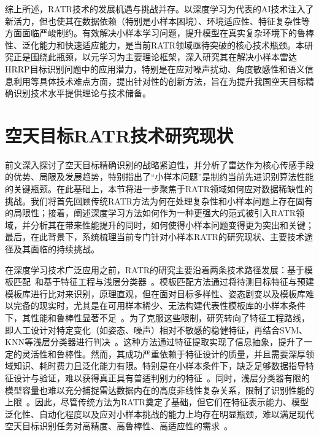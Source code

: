 综上所述，RATR技术的发展机遇与挑战并存。以深度学习为代表的AI技术注入了新活力，但也使其在数据依赖（特别是小样本困境）、环境适应性、特征复杂性等方面面临严峻制约。有效解决小样本学习问题，提升模型在真实复杂环境下的鲁棒性、泛化能力和快速适应能力，是当前RATR领域亟待突破的核心技术瓶颈。本研究正是围绕此瓶颈，以元学习为主要理论框架，深入研究其在解决小样本雷达HRRP目标识别问题中的应用潜力，特别是在应对噪声扰动、角度敏感性和语义信息利用等具体技术难点方面，提出针对性的创新方法，旨在为提升我国空天目标精确识别技术水平提供理论与技术储备。

\section{空天目标RATR技术研究现状}
前文深入探讨了空天目标精确识别的战略紧迫性，并分析了雷达作为核心传感手段的优势、局限及发展趋势，特别指出了“小样本问题”是制约当前先进识别算法性能的关键瓶颈。在此基础上，本节将进一步聚焦于RATR领域如何应对数据稀缺性的挑战。我们将首先回顾传统RATR方法为何在处理复杂性和小样本问题上存在固有的局限性；接着，阐述深度学习方法如何作为一种更强大的范式被引入RATR领域，并分析其在带来性能提升的同时，如何使得小样本问题变得更为突出和关键；最后，在此背景下，系统梳理当前专门针对小样本RATR的研究现状、主要技术途径及其面临的持续挑战。

在深度学习技术广泛应用之前，RATR的研究主要沿着两条技术路径发展：基于模板匹配~\cite{X}和基于特征工程与浅层分类器~\cite{X}。模板匹配方法通过将待测目标特征与预建模板库进行比对来识别，原理直观，但在面对目标多样性、姿态剧变以及模板库难以完备的现实时，尤其是在可用样本稀少、无法构建代表性模板库的小样本条件下，其性能和鲁棒性显著不足~\cite{X}。为了克服这些限制，研究转向了特征工程路线，即人工设计对特定变化（如姿态、噪声）相对不敏感的稳健特征，再结合SVM、KNN等浅层分类器进行判决~\cite{X}。这种方法通过特征提取实现了信息抽象，提升了一定的灵活性和鲁棒性。然而，其成功严重依赖于特征设计的质量，并且需要深厚领域知识、耗时费力且泛化能力有限。特别是在小样本条件下，缺乏足够数据指导特征设计与验证，难以获得真正具有普适判别力的特征~\cite{X}。同时，浅层分类器有限的模型容量也难以充分捕捉雷达数据内在的高度非线性复杂关系，限制了识别性能的上限~\cite{X}。因此，尽管传统方法为RATR奠定了基础，但它们在特征表示能力、模型泛化性、自动化程度以及应对小样本挑战的能力上均存在明显瓶颈，难以满足现代空天目标识别任务对高精度、高鲁棒性、高适应性的需求~\cite{X}。

